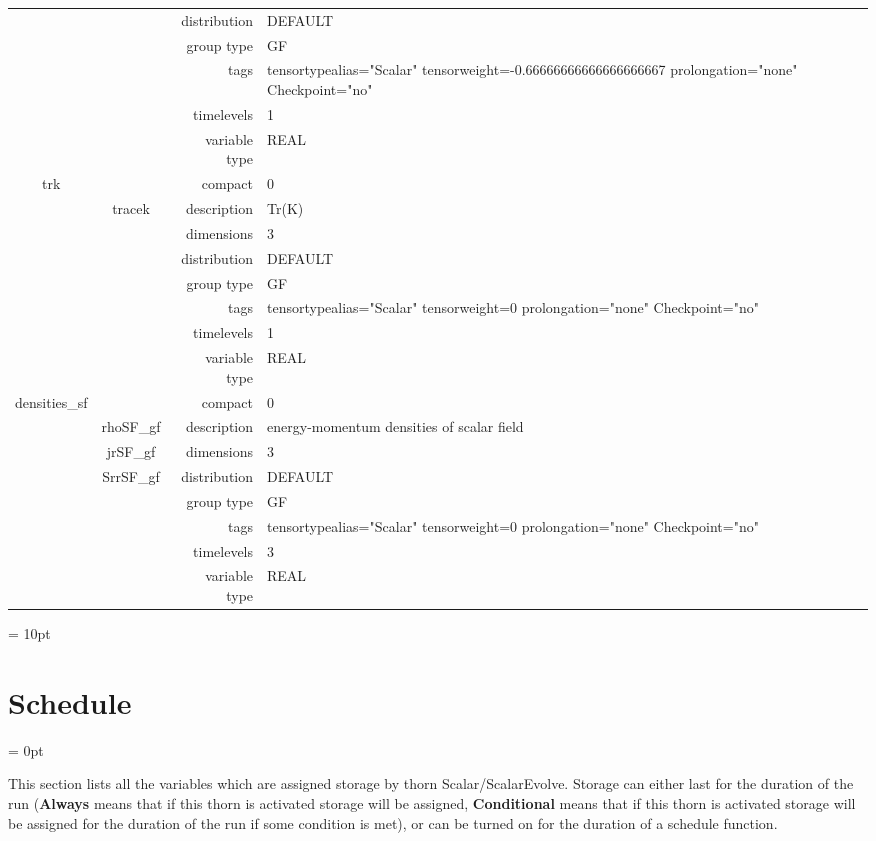 \begin{tabular*}{150mm}{|c|c@{\extracolsep{\fill}}|rl|}
 &  & distribution & DEFAULT \\ 
 &  & group type & GF \\ 
 &  & tags & tensortypealias="Scalar" tensorweight=-0.66666666666666666667 prolongation="none" Checkpoint="no" \\ 
 &  & timelevels & 1 \\ 
 &  & variable type & REAL \\ 
\hline 
trk &  & compact & 0 \\ 
 & tracek & description & Tr(K) \\ 
 &  & dimensions & 3 \\ 
 &  & distribution & DEFAULT \\ 
 &  & group type & GF \\ 
 &  & tags & tensortypealias="Scalar" tensorweight=0 prolongation="none" Checkpoint="no" \\ 
 &  & timelevels & 1 \\ 
 &  & variable type & REAL \\ 
\hline 
densities\_sf &  & compact & 0 \\ 
 & rhoSF\_gf & description & energy-momentum densities of scalar field \\ 
 & jrSF\_gf & dimensions & 3 \\ 
 & SrrSF\_gf & distribution & DEFAULT \\ 
 &  & group type & GF \\ 
 &  & tags & tensortypealias="Scalar" tensorweight=0 prolongation="none" Checkpoint="no" \\ 
 &  & timelevels & 3 \\ 
 &  & variable type & REAL \\ 
\hline 
\end{tabular*} 



\vspace{5mm}\parskip = 10pt 

\section{Schedule} 


\parskip = 0pt


\noindent This section lists all the variables which are assigned storage by thorn Scalar/ScalarEvolve.  Storage can either last for the duration of the run ({\bf Always} means that if this thorn is activated storage will be assigned, {\bf Conditional} means that if this thorn is activated storage will be assigned for the duration of the run if some condition is met), or can be turned on for the duration of a schedule function.


